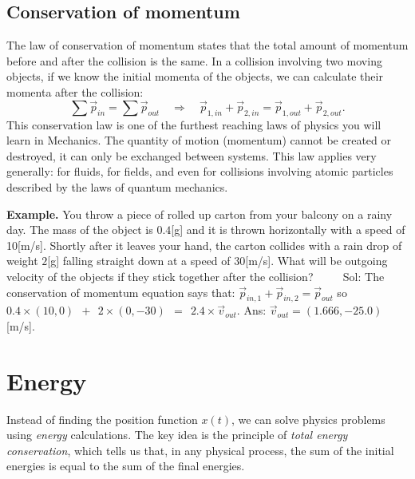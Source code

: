 \documentclass[letterpaper,9pt,journal]{IEEEtran}
\newcommand{\be}{\begin{equation}}
\newcommand{\ee}{\end{equation}}
\begin{document}
\vspace{-3mm}
\subsection{Conservation of momentum}

The law of conservation of momentum states that the total amount of momentum before and
after the collision is the same. 
In a collision involving two moving objects, if we know the initial momenta
of the objects, we can calculate their momenta after the collision:
\be
 \sum \vec{p}_{in} = \sum \vec{p}_{out} \quad \Rightarrow \quad
  \vec{p}_{1,in} + \vec{p}_{2,in}  =    \vec{p}_{1,out} + \vec{p}_{2,out}.
  \label{CONSofMOMENTUM}
\ee
This conservation law is one of the furthest reaching laws of physics you will learn in Mechanics.
The quantity of motion (momentum) cannot be created or destroyed,  it can only be exchanged between systems.
This law applies very generally: for fluids, for fields, and even for collisions involving atomic particles 
described by the laws of quantum mechanics. 


{\bf Example.} 
You throw a piece of rolled up carton from your balcony on a rainy day.
The mass of the object is $0.4$[g] and it is thrown horizontally with a speed of 10[m/s].
Shortly after it leaves your hand, the carton collides with a rain drop of weight $2$[g]
falling straight down at a speed of $30$[m/s].
What will be outgoing velocity of the objects if they stick together after the collision?
$\qquad$ 
Sol: The conservation of momentum equation says that: $\vec{p}_{in,1} + \vec{p}_{in,2} = \vec{p}_{out}$
so $0.4\times (10,0) \ \ + \ \  2\times (0,-30) \ \  = \ \ 2.4 \times \vec{v}_{out}$.
Ans: $\vec{v}_{out} =(1.666, - 25.0)$[m/s].



\section{Energy}
\label{sec:energy}

Instead of finding the %
position function $x(t)$, 
we can solve physics problems using \emph{energy} calculations.
The key idea  is the principle of \emph{total energy conservation}, 
which tells us that, in any physical process, 
the sum of the initial energies is equal to the sum of the final energies.

%
\end{document}
